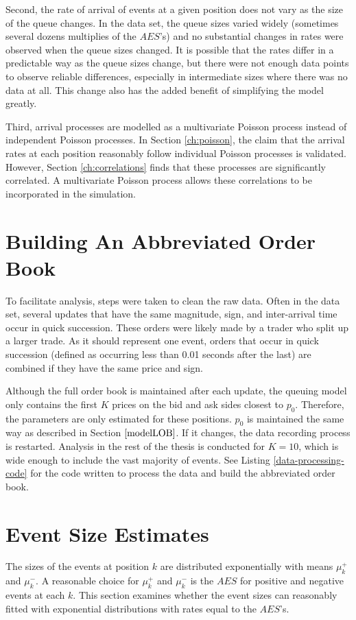 Second, the rate of arrival of events at a given position does not vary as the size of the queue changes. In the data set, the queue sizes varied widely (sometimes several dozens multiplies of the $AES$'s) and no substantial changes in rates were observed when the queue sizes changed. It is possible that the rates differ in a predictable way as the queue sizes change, but there were not enough data points to observe reliable differences, especially in intermediate sizes where there was no data at all. This change also has the added benefit of simplifying the model greatly.

Third, arrival processes are modelled as a multivariate Poisson process instead of independent Poisson processes. In Section \ref{ch:poisson}, the claim that the arrival rates at each position reasonably follow individual Poisson processes is validated. However, Section \ref{ch:correlations} finds that these processes are significantly correlated. A multivariate Poisson process allows these correlations to be incorporated in the simulation.

\section{Building An Abbreviated Order Book}
To facilitate analysis, steps were taken to clean the raw data. Often in the data set, several updates that have the same magnitude, sign, and inter-arrival time occur in quick succession. These orders were likely made by a trader who split up a larger trade. As it should represent one event, orders that occur in quick succession (defined as occurring less than 0.01 seconds after the last) are combined if they have the same price and sign. 

Although the full order book is maintained after each update, the queuing model only contains the first $K$ prices on the bid and ask sides closest to $p_0$. Therefore, the parameters are only estimated for these positions. $p_0$ is maintained the same way as described in Section $\ref{modelLOB}$. If it changes, the data recording process is restarted. Analysis in the rest of the thesis is conducted for $K=10$, which is wide enough to include the vast majority of events. See Listing \ref{data-processing-code} for the code written to process the data and build the abbreviated order book.

\section{Event Size Estimates}\label{ch:event_sizes}
The sizes of the events at position $k$ are distributed exponentially with means $\mu^+_k$ and $\mu^-_k$. A reasonable choice for $\mu^+_k$ and $\mu^-_k$ is the $AES$ for positive and negative events at each $k$. This section examines whether the event sizes can reasonably fitted with exponential distributions with rates equal to the $AES$'s. 

